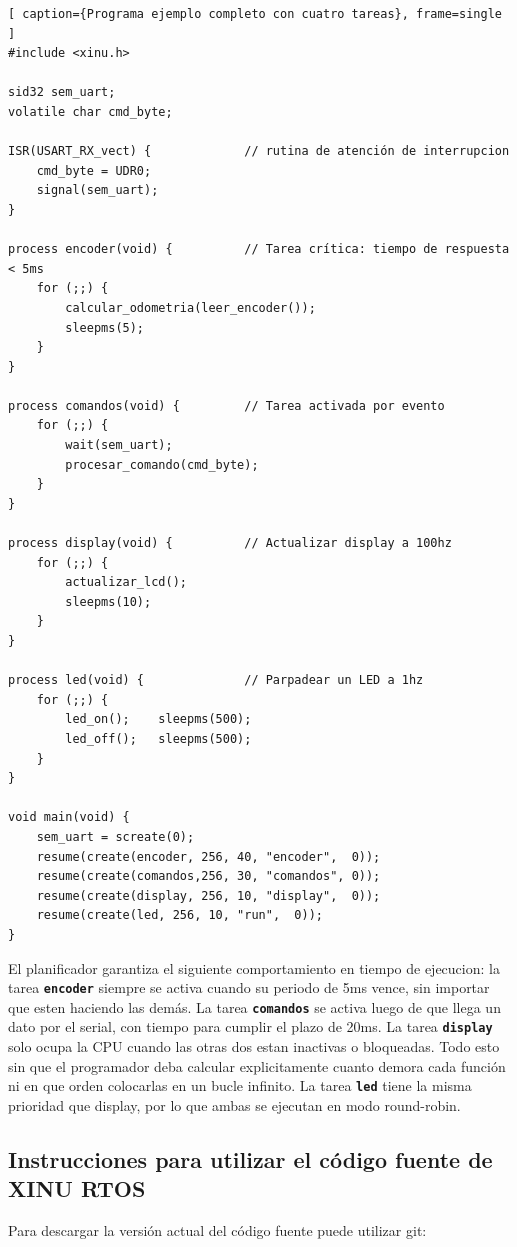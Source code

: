 \documentclass[output=paper, 
colorlinks,
citecolor=brown,
newtxmath
]{langscibook}
\begin{document}
\begin{lstlisting}[ caption={Programa ejemplo completo con cuatro tareas}, frame=single ]
#include <xinu.h>

sid32 sem_uart;
volatile char cmd_byte;

ISR(USART_RX_vect) {             // rutina de atención de interrupcion
    cmd_byte = UDR0;
    signal(sem_uart);
}

process encoder(void) {          // Tarea crítica: tiempo de respuesta < 5ms
    for (;;) {
        calcular_odometria(leer_encoder());
        sleepms(5);
    }
}

process comandos(void) {         // Tarea activada por evento
    for (;;) {
        wait(sem_uart);
        procesar_comando(cmd_byte);
    }
}

process display(void) {          // Actualizar display a 100hz
    for (;;) {
        actualizar_lcd();
        sleepms(10);
    }
}

process led(void) {              // Parpadear un LED a 1hz
    for (;;) {
        led_on();    sleepms(500);
        led_off();   sleepms(500);
    }
}

void main(void) {
    sem_uart = screate(0);
    resume(create(encoder, 256, 40, "encoder",  0));
    resume(create(comandos,256, 30, "comandos", 0));
    resume(create(display, 256, 10, "display",  0));
    resume(create(led, 256, 10, "run",  0));
}
\end{lstlisting}

El planificador garantiza el siguiente comportamiento en tiempo de ejecucion: la tarea \texttt{\textbf{encoder}} siempre se activa cuando su periodo de 5ms vence, sin importar que esten haciendo las demás. 
La tarea \texttt{\textbf{comandos}} se activa luego de que llega un dato por el serial, con tiempo para cumplir el plazo de 20ms. 
La tarea \texttt{\textbf{display}} solo ocupa la CPU cuando las otras dos estan inactivas o bloqueadas. Todo esto sin que el programador deba calcular explicitamente cuanto demora cada función ni en que orden colocarlas en un bucle infinito. La tarea \texttt{\textbf{led}} tiene la misma prioridad que display, por
lo que ambas se ejecutan en modo round-robin.



\subsection{Instrucciones para utilizar el código fuente de XINU RTOS}

Para descargar la versión actual del código fuente puede utilizar git:
\end{document}
